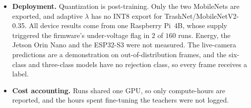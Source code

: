 \begin{itemize}
  \item \textbf{Deployment.} Quantization is post-training. Only the two MobileNets are exported, and adaptive $\lambda$ has no INT8 export for TrashNet/MobileNetV2-0.35. All device results come from one Raspberry Pi~4B, whose supply triggered the firmware's under-voltage flag in $2$ of $160$ runs. Energy, the Jetson Orin Nano and the ESP32-S3 were not measured. The live-camera predictions are a demonstration on out-of-distribution frames, and the six-class and three-class models have no rejection class, so every frame receives a label.
  \item \textbf{Cost accounting.} Runs shared one GPU, so only compute-hours are reported, and the hours spent fine-tuning the teachers were not logged.
\end{itemize}
